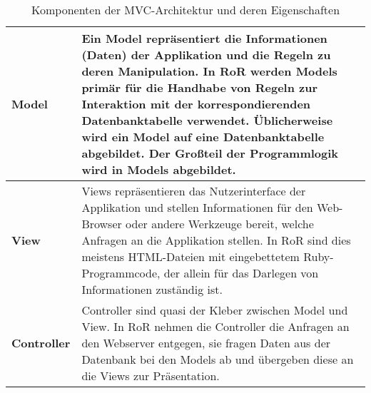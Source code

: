 \begin{table}[ht] \centering \caption{Komponenten der MVC-Architektur und deren
Eigenschaften\footnotemark}\label{ref:tabMVC}
\begin{tabular}{|p{2cm}|p{12cm}|}\hline 
\textbf{Model}&Ein Model repräsentiert
die Informationen (Daten) der Applikation und die Regeln zu deren Manipulation.
In RoR werden Models primär für die Handhabe von Regeln zur Interaktion mit der
korrespondierenden Datenbanktabelle verwendet. Üblicherweise wird ein Model auf
eine Datenbanktabelle abgebildet. Der Großteil der Programmlogik wird in Models
abgebildet.\\\hline 

\textbf{View}&Views repräsentieren das Nutzerinterface der
Applikation und stellen Informationen für den Web-Browser oder andere Werkzeuge
bereit, welche Anfragen an die Applikation stellen. In RoR sind dies meistens
HTML-Dateien mit eingebettetem Ruby-Programmcode, der allein für das Darlegen
von Informationen zuständig ist.\\\hline
 
\textbf{Controller}&Controller sind quasi der Kleber zwischen Model und
View. In RoR nehmen die Controller die Anfragen an den Webserver
entgegen, sie fragen Daten aus der Datenbank bei den Models ab und
übergeben diese an die Views zur Präsentation.\\\hline
\end{tabular}
\end{table}
